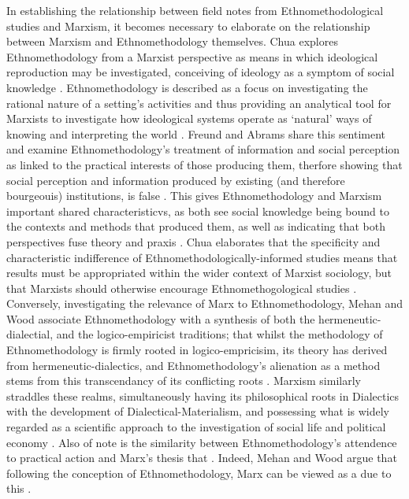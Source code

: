In establishing the relationship between field notes from Ethnomethodological studies and Marxism, it becomes necessary to elaborate on the relationship between Marxism and Ethnomethodology themselves. Chua explores Ethnomethodology from a Marxist perspective as means in which ideological reproduction may be investigated, conceiving of ideology as a symptom of social knowledge \cite{chua_delineating_1977}. Ethnomethodology is described as a focus on investigating the rational nature of a setting's activities and thus providing an analytical tool for Marxists to investigate how ideological systems operate as `natural' ways of knowing and interpreting the world \cite{chua_delineating_1977}. Freund and Abrams share this sentiment and examine Ethnomethodology's treatment of information and social perception as linked to the practical interests of those producing them, therfore showing that social perception and information produced by existing (and therefore bourgeouis) institutions, is false \cite{freund_ethnomethodology_1976}. This gives Ethnomethodology and Marxism important shared characteristicvs, as both see social knowledge being bound to the contexts and methods that produced them, as well as indicating that both perspectives fuse theory and praxis \cite{freund_ethnomethodology_1976}. Chua elaborates that the specificity and characteristic indifference of Ethnomethodologically-informed studies means that results must be appropriated within the wider context of Marxist sociology, but that Marxists should otherwise encourage Ethnomethogological studies \cite{chua_delineating_1977}. Conversely, investigating the relevance of Marx to Ethnomethodology, Mehan and Wood associate Ethnomethodology with a synthesis of both the hermeneutic-dialectial, and the logico-empiricist traditions; that whilst the methodology of Ethnomethodology is firmly rooted in logico-empricisim, its theory has derived from hermeneutic-dialectics, and Ethnomethodology's alienation as a method stems from this transcendancy of its conflicting roots \cite{mehan_morality_1975}. Marxism similarly straddles these realms, simultaneously having its philosophical roots in Dialectics with the development of Dialectical-Materialism, and possessing what is widely regarded as a scientific approach to the investigation of social life and political economy \cite{thomas_marxism_2008}. Also of note is the similarity between Ethnomethodology's attendence to practical action \cite{garfinkel_studies_1967, crabtree_doing_2012} and Marx's thesis that  \cite{marx_theses_1963}. Indeed, Mehan and Wood argue that following the conception of Ethnomethodology, Marx can be viewed as a  due to this \cite{mehan_morality_1975}.

